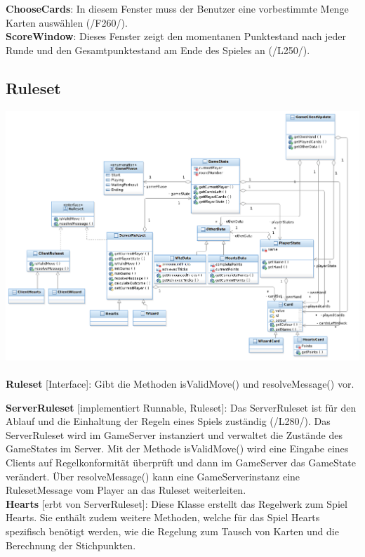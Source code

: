 \documentclass{article}
\begin{document}
\textbf{ChooseCards}: In diesem Fenster muss der Benutzer eine vorbestimmte Menge Karten auswählen (/F260/). \\

\textbf{ScoreWindow}: Dieses Fenster zeigt den momentanen Punktestand nach jeder Runde und den Gesamtpunktestand am Ende des Spieles an (/L250/).\\


\subsection{Ruleset}
\includegraphics[width=\textwidth]{Entwurf_RulesetDiagram}
\\ \\
\textbf{Ruleset} [Interface]: Gibt die Methoden isValidMove() und resolveMessage() vor.

\textbf{ServerRuleset} [implementiert Runnable, Ruleset]: Das ServerRuleset  ist für den Ablauf und die Einhaltung der Regeln eines Spiels zuständig (/L280/). Das ServerRuleset wird im GameServer instanziert und verwaltet die Zustände des GameStates im Server. Mit der Methode isValidMove() wird eine Eingabe eines Clients auf Regelkonformität überprüft und dann im GameServer  das GameState verändert. Über resolveMessage() kann eine GameServerinstanz eine RulesetMessage vom Player an das Ruleset weiterleiten. \\
		
\textbf{Hearts} [erbt von ServerRuleset]:  Diese Klasse erstellt das Regelwerk zum Spiel Hearts. Sie enthält zudem weitere Methoden, welche für das Spiel Hearts spezifisch benötigt werden, wie die Regelung zum Tausch von Karten und die Berechnung der Stichpunkten. \\
		
\end{document}
